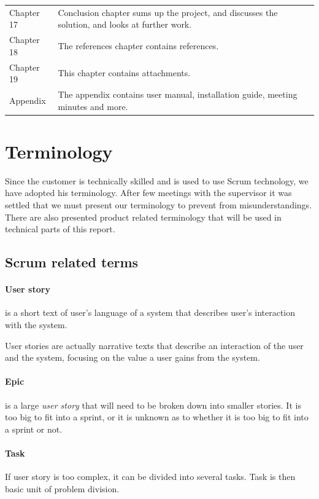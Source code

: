 \begin{table}[!h]
\begin{tabularx}{\textwidth}{lX}
Chapter 17 	 &  Conclusion chapter sums up the project, and discusses the solution, and looks at further work. \\

Chapter 18 	 &  The references chapter contains references. \\

Chapter 19 	 &  This chapter contains attachments. \\
\midrule
Appendix 	 &   The appendix contains user manual, installation guide, meeting minutes and more.\\

\bottomrule[1mm]
\end{tabularx}
\end{table}

\section {Terminology}
\label{sec:terminology}
Since the customer is technically skilled and is used to use Scrum technology, we have adopted his terminology.
After few meetings with the supervisor it was settled that we must present our terminology to prevent from misunderstandings. 
There are also presented product related terminology that will be used in technical parts of this report.

\subsection{Scrum related terms}

\paragraph{User story}
is a short text of user's language of a system that describes user's interaction with the system.

User stories are actually narrative texts that describe an interaction of the user and the system, focusing on the value a user gains from the system.

\paragraph{Epic}
is a large \emph{user story} that will need to be broken down into smaller stories. It is too big to fit into a sprint, or it is unknown as to whether it is too big to fit into a sprint or not.

\paragraph{Task}
If user story is too complex, it can be divided into several tasks. 
Task is then basic unit of problem division.


